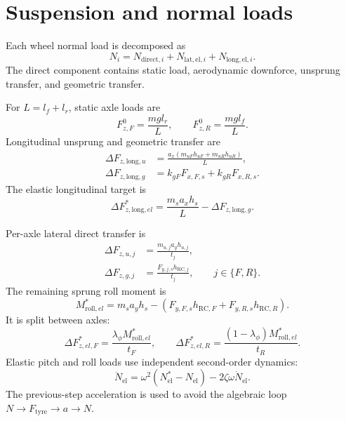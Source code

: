 \documentclass[11pt,a4paper]{article}
\begin{document}
\section{Suspension and normal loads}

Each wheel normal load is decomposed as
\begin{equation}
  N_i=N_{\mathrm{direct},i}
  +N_{\mathrm{lat,el},i}
  +N_{\mathrm{long,el},i}.
\end{equation}
The direct component contains static load, aerodynamic downforce, unsprung
transfer, and geometric transfer.

For \(L=l_f+l_r\), static axle loads are
\begin{equation}
  F_{z,F}^{0}=\frac{mgl_r}{L},\qquad
  F_{z,R}^{0}=\frac{mgl_f}{L}.
\end{equation}
Longitudinal unsprung and geometric transfer are
\begin{align}
  \Delta F_{z,\mathrm{long},u}
  &=\frac{a_x(m_{uF}h_{uF}+m_{uR}h_{uR})}{L},\\
  \Delta F_{z,\mathrm{long},g}
  &=k_{gF}F_{x,F,s}+k_{gR}F_{x,R,s}.
\end{align}
The elastic longitudinal target is
\begin{equation}
  \Delta F_{z,\mathrm{long},el}^{*}
  =\frac{m_sa_xh_s}{L}
  -\Delta F_{z,\mathrm{long},g}.
\end{equation}

Per-axle lateral direct transfer is
\begin{align}
  \Delta F_{z,u,j} &= \frac{m_{u,j}a_yh_{u,j}}{t_j},\\
  \Delta F_{z,g,j} &= \frac{F_{y,j,s}h_{\mathrm{RC},j}}{t_j},
  \qquad j\in\{F,R\}.
\end{align}
The remaining sprung roll moment is
\begin{equation}
  M_{\mathrm{roll},el}^{*}
  =m_sa_yh_s-
  \left(F_{y,F,s}h_{\mathrm{RC},F}
  +F_{y,R,s}h_{\mathrm{RC},R}\right).
\end{equation}
It is split between axles:
\begin{equation}
  \Delta F_{z,el,F}^{*}
  =\frac{\lambda_\phi M_{\mathrm{roll},el}^{*}}{t_F},
  \qquad
  \Delta F_{z,el,R}^{*}
  =\frac{(1-\lambda_\phi)M_{\mathrm{roll},el}^{*}}{t_R}.
\end{equation}
Elastic pitch and roll loads use independent second-order dynamics:
\begin{equation}
  \ddot N_{\mathrm{el}}
  =\omega^2(N_{\mathrm{el}}^{*}-N_{\mathrm{el}})
  -2\zeta\omega\dot N_{\mathrm{el}}.
\end{equation}
The previous-step acceleration is used to avoid the algebraic loop
\(N\rightarrow F_{\mathrm{tyre}}\rightarrow a\rightarrow N\).
\end{document}
